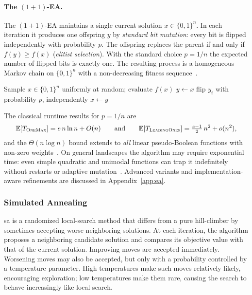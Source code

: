 \paragraph{The $(1+1)$-EA.}
\label{par:oneone-ea}
The $(1+1)$-EA maintains a single current solution $x \in \{0,1\}^n$. In each
iteration it produces one offspring $y$ by \emph{standard bit
mutation}: every bit is
flipped independently with probability $p$. The offspring replaces
the parent if and
only if $f(y) \geq f(x)$ (\emph{elitist selection}). With the
standard choice $p =
1/n$ the expected number of flipped bits is exactly one. The
resulting process is a
homogeneous Markov chain on $\{0,1\}^n$ with a non-decreasing fitness
sequence~\cite{droste2002analysis,witt2013tight}.

\begin{algorithm}[H]
  \caption{The $(1+1)$-EA with mutation probability $p \in (0,1)$}
  \label{alg:oneone-ea}
  \begin{algorithmic}[1]
    \State Sample $x \in \{0,1\}^n$ uniformly at random; evaluate $f(x)$
    \Repeat
    \State $y \gets x$
    \State flip $y_i$ with probability $p$, independently
    \EndFor
     $x \gets y$ \EndIf
  \end{algorithmic}
\end{algorithm}

\noindent The classical runtime results for $p = 1/n$ are
\[
  \mathbb{E}[T_{\textsc{OneMax}}] = e\,n\ln n + O(n)
  \qquad \text{and} \qquad
  \mathbb{E}[T_{\textsc{LeadingOnes}}] = \tfrac{e-1}{2}\,n^2 + o(n^2),
\]
and the $\Theta(n\log n)$ bound extends to \emph{all} linear
pseudo-Boolean functions
with non-zero weights~\cite{witt2013tight}. On general landscapes the
algorithm may require
exponential time: even simple quadratic and unimodal functions can trap it
indefinitely without restarts or adaptive
mutation~\cite{droste2002analysis}. Advanced variants and
implementation-aware refinements are discussed in
Appendix~\ref{app:ea}.

\subsubsection{Simulated Annealing}
\acrfull{sa} is a randomized local-search method that differs from a
pure hill-climber by sometimes accepting worse neighboring solutions.
At each iteration, the algorithm proposes a neighboring candidate
solution and compares its objective value with that of the current
solution. Improving moves are accepted immediately. Worsening moves may
also be accepted, but only with a probability controlled by a
temperature parameter. High temperatures make such moves relatively
likely, encouraging exploration; low temperatures make them rare,
causing the search to behave increasingly like local search.

